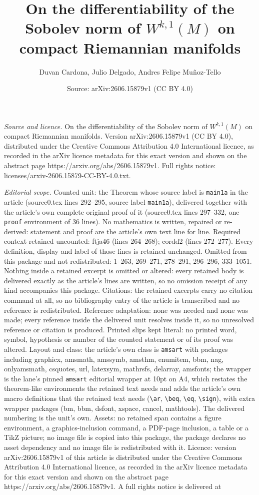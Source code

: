 \documentclass[10pt,a4paper]{amsart}
\title[On the differentiability of the Sobolev norm of $W^{k,1}(M)$]{On the differentiability of the Sobolev norm of $W^{k,1}(M)$ on compact Riemannian manifolds}
\author{Duvan Cardona, Julio Delgado, Andres Felipe Mu\~noz-Tello}
\date{Source: arXiv:2606.15879v1 (CC BY 4.0)}
\begin{document}
\maketitle

\noindent\emph{Source and licence.} On the differentiability of the Sobolev norm of $W^{k,1}(M)$ on compact Riemannian manifolds. Version arXiv:2606.15879v1 (CC BY 4.0), distributed under the Creative Commons Attribution 4.0 International licence, as recorded in the arXiv licence metadata for this exact version and shown on the abstract page https://arxiv.org/abs/2606.15879v1. Full rights notice: licenses/arxiv-2606.15879-CC-BY-4.0.txt.\par\smallskip

\noindent\textit{Editorial scope.} Counted unit: the Theorem whose source label is \texttt{main1a} in the article (source0.tex lines 292--295, source label \texttt{main1a}), delivered together with the article's own complete original proof of it (source0.tex lines 297--332, one \texttt{proof} environment of 36 lines). No mathematics is written, repaired or re-derived: statement and proof are the article's own text line for line. Required context retained uncounted: ftja46 (lines 264--268); cordd2 (lines 272--277). Every definition, display and label of those lines is retained unchanged. Omitted from this package and not redistributed: 1--263, 269--271, 278--291, 296--296, 333--1051. Nothing inside a retained excerpt is omitted or altered: every retained body is delivered exactly as the article's lines are written, so no omission receipt of any kind accompanies this package. Citations: the retained excerpts carry no citation command at all, so no bibliography entry of the article is transcribed and no reference is redistributed. Reference adaptation: none was needed and none was made; every reference inside the delivered unit resolves inside it, so no unresolved reference or citation is produced. Printed slips kept literal: no printed word, symbol, hypothesis or number of the counted statement or of its proof was altered. Layout and class: the article's own class is \texttt{amsart} with packages including graphicx, amsmath, amssymb, amsthm, enumitem, bbm, nag, onlyamsmath, csquotes, url, latexsym, mathrsfs, delarray, amsfonts; the wrapper is the lane's pinned \texttt{amsart} editorial wrapper at 10pt on A4, which restates the theorem-like environments the retained text needs and adds the article's own macro definitions that the retained text needs (\texttt{\textbackslash ar}, \texttt{\textbackslash beq}, \texttt{\textbackslash eq}, \texttt{\textbackslash sign}), with extra wrapper packages (bm, bbm, dsfont, xspace, cancel, mathtools). The delivered numbering is the unit's own. Assets: no retained span contains a figure environment, a graphics-inclusion command, a PDF-page inclusion, a table or a TikZ picture; no image file is copied into this package, the package declares no asset dependency and no image file is redistributed with it. Licence: version arXiv:2606.15879v1 of this article is distributed under the Creative Commons Attribution 4.0 International licence, as recorded in the arXiv licence metadata for this exact version and shown on the abstract page https://arxiv.org/abs/2606.15879v1. A full rights notice is delivered at 
\end{document}
